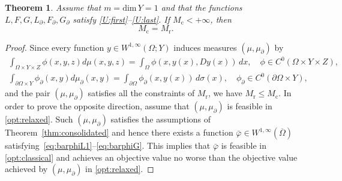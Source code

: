 \documentclass{article}
\newtheorem{theorem}{Theorem}[section]
\theoremstyle{definition}
\theoremstyle{remark}
\begin{document}
\begin{theorem}
 \label{thm:nogap}
 Assume that $m = \mathrm{dim}\,Y = 1$ and that the functions $L,F,G,L_\partial, F_\partial,G_\partial$ satisfy \ref{U:first}--\ref{U:last}.
%
If $M_\mathrm{c}<+\infty$, then \[M_\mathrm{c}=M_\mathrm{r}.\] 
\end{theorem}
\begin{proof}
 Since every function $y\in W^{1,\infty}(\Omega;Y)$ induces measures $(\mu,\mu_\partial)$ by 
 \begin{gather*}
 \int_{\Omega\times Y\times Z}\phi(x,y,z)d\mu(x,y,z)=\int_{\Omega}\phi(x,y(x),Dy(x))\,dx,\quad \phi\in C^0(\Omega\times Y\times Z),\\
 \int_{\partial \Omega\times Y}\phi_\partial(x,y) d\mu_\partial(x,y)=\int_{\partial\Omega}\phi_\partial(x,y(x))\,d\sigma(x),\quad \phi_\partial\in C^0(\partial\Omega\times Y),
 \end{gather*}
 and the pair $(\mu,\mu_\partial)$ satisfies all the constraints of $M_\mathrm{r}$,
 we have $M_\mathrm{r}\leq M_\mathrm{c}$. In order to prove the opposite direction, assume that $(\mu,\mu_\partial)$ is feasible in \eqref{opt:relaxed}. Such $(\mu,\mu_\partial)$ satisfies the assumptions of Theorem~\ref{thm:consolidated} and hence there exists a function $\bar\varphi \in W^{1,\infty}(\overline\Omega)$ satisfying~\eqref{eq:barphiL1}--\eqref{eq:barphiG}. This implies that $\bar\varphi$ is feasible in \eqref{opt:classical} and achieves an objective value no worse than the objective value achieved by $(\mu,\mu_\partial)$ in \eqref{opt:relaxed}.
\end{proof}
\end{document}
